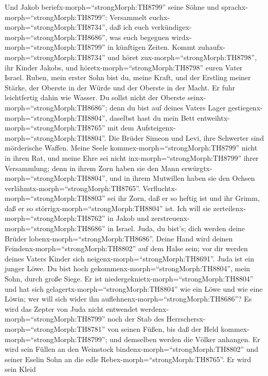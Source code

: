  Und Jakob beriefx-morph=``strongMorph:TH8799'' seine Söhne
und sprachx-morph=``strongMorph:TH8799'': Versammelt
euchx-morph=``strongMorph:TH8734'', daß ich euch
verkündigex-morph=``strongMorph:TH8686'', was euch begegnen
wirdx-morph=``strongMorph:TH8799'' in künftigen Zeiten. 
Kommt zuhaufx-morph=``strongMorph:TH8734'' und höret
zux-morph=``strongMorph:TH8798'', ihr Kinder Jakobs, und
höretx-morph=``strongMorph:TH8798'' euren Vater Israel. 
Ruben, mein erster Sohn bist du, meine Kraft, und der Erstling meiner
Stärke, der Oberste in der Würde und der Oberste in der Macht.
 Er fuhr leichtfertig dahin wie Wasser. Du sollst nicht der
Oberste seinx-morph=``strongMorph:TH8686''; denn du bist auf deines
Vaters Lager gestiegenx-morph=``strongMorph:TH8804'', daselbst hast du
mein Bett entweihtx-morph=``strongMorph:TH8765'' mit dem
Aufsteigenx-morph=``strongMorph:TH8804''.  Die Brüder Simeon
und Levi, ihre Schwerter sind mörderische Waffen.  Meine
Seele kommex-morph=``strongMorph:TH8799'' nicht in ihren Rat, und meine
Ehre sei nicht inx-morph=``strongMorph:TH8799'' ihrer Versammlung; denn
in ihrem Zorn haben sie den Mann erwürgtx-morph=``strongMorph:TH8804'',
und in ihrem Mutwillen haben sie den Ochsen
verlähmtx-morph=``strongMorph:TH8765''. 
Verfluchtx-morph=``strongMorph:TH8803'' sei ihr Zorn, daß er so heftig
ist und ihr Grimm, daß er so störrigx-morph=``strongMorph:TH8804'' ist.
Ich will sie zerteilenx-morph=``strongMorph:TH8762'' in Jakob und
zerstreuenx-morph=``strongMorph:TH8686'' in Israel.  Juda,
du bist's; dich werden deine Brüder lobenx-morph=``strongMorph:TH8686''.
Deine Hand wird deinen Feindenx-morph=``strongMorph:TH8802'' auf dem
Halse sein; vor dir werden deines Vaters Kinder sich
neigenx-morph=``strongMorph:TH8691''.  Juda ist ein junger
Löwe. Du bist hoch gekommenx-morph=``strongMorph:TH8804'', mein Sohn,
durch große Siege. Er ist niedergeknietx-morph=``strongMorph:TH8804''
und hat sich gelagertx-morph=``strongMorph:TH8804'' wie ein Löwe und wie
eine Löwin; wer will sich wider ihn
auflehnenx-morph=``strongMorph:TH8686''?  Es wird das
Zepter von Juda nicht entwendet werdenx-morph=``strongMorph:TH8799''
noch der Stab des Herrschersx-morph=``strongMorph:TH8781'' von seinen
Füßen, bis daß der Held kommex-morph=``strongMorph:TH8799''; und
demselben werden die Völker anhangen.  Er wird sein Füllen
an den Weinstock bindenx-morph=``strongMorph:TH8802'' und seiner Eselin
Sohn an die edle Rebex-morph=``strongMorph:TH8765''. Er wird sein Kleid

